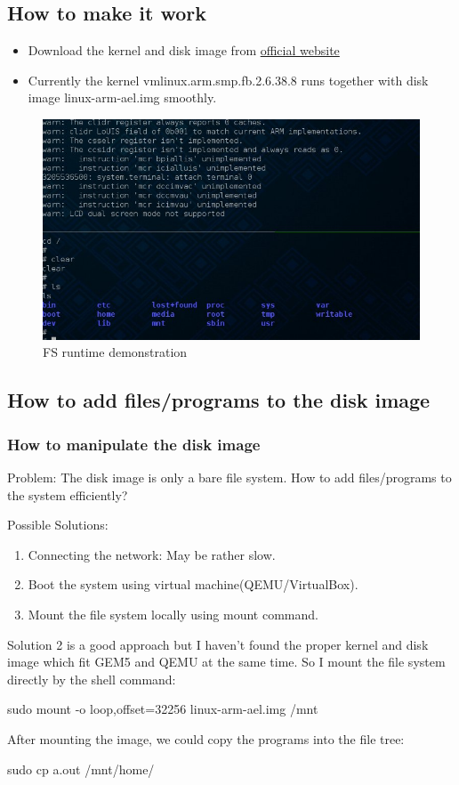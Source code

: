\documentclass{beamer}
\begin{document}
\subsection{How to make it work}
\begin{frame}
    \begin{itemize}
	\item Download the kernel and disk image from \href{http://www.m5sim.org/Download}{official website}
	\item Currently the kernel vmlinux.arm.smp.fb.2.6.38.8 runs together with disk image linux-arm-ael.img smoothly.
    \end{itemize}
    \begin{figure}[H]
	\begin{center}
	    \includegraphics[scale=0.5]{back10.jpg}
	\end{center}
	\caption{FS runtime demonstration}
    \end{figure}
\end{frame}
\subsection{How to add files/programs to the disk image}
\begin{frame}
    \frametitle{How to manipulate the disk image}
    Problem: The disk image is only a bare file system. How to add
    files/programs to the system efficiently? \par Possible Solutions:
    \begin{enumerate}
	\item Connecting the network: May be rather slow.
	\item Boot the system using virtual machine(QEMU/VirtualBox).
	\item Mount the file system locally using mount command.
    \end{enumerate}
    Solution 2 is a good approach but I haven't found the proper kernel and
    disk image which fit GEM5 and QEMU at the same time. So I mount the file
    system directly by the shell command:\par
\qquad	sudo mount -o loop,offset=32256 linux-arm-ael.img /mnt\par
    After mounting the image, we could copy the programs into the file
    tree:\par   
    \qquad sudo cp a.out /mnt/home/\par
\end{frame}
\end{document}
